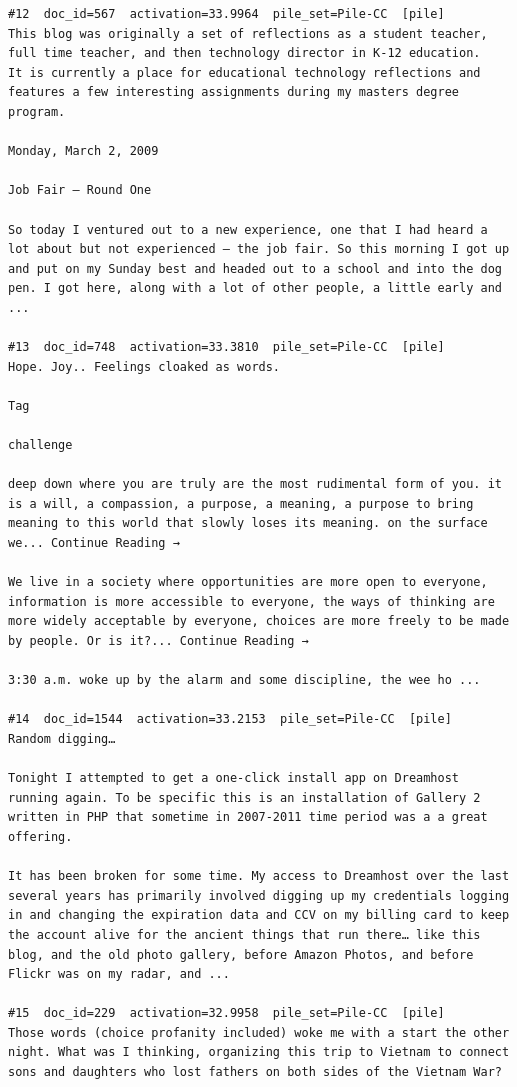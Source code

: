 \begin{verbatim}
#12  doc_id=567  activation=33.9964  pile_set=Pile-CC  [pile]
This blog was originally a set of reflections as a student teacher, full time teacher, and then technology director in K-12 education.
It is currently a place for educational technology reflections and features a few interesting assignments during my masters degree program.

Monday, March 2, 2009

Job Fair – Round One

So today I ventured out to a new experience, one that I had heard a lot about but not experienced – the job fair. So this morning I got up and put on my Sunday best and headed out to a school and into the dog pen. I got here, along with a lot of other people, a little early and ...

#13  doc_id=748  activation=33.3810  pile_set=Pile-CC  [pile]
Hope. Joy.. Feelings cloaked as words.

Tag

challenge

deep down where you are truly are the most rudimental form of you. it is a will, a compassion, a purpose, a meaning, a purpose to bring meaning to this world that slowly loses its meaning. on the surface we... Continue Reading →

We live in a society where opportunities are more open to everyone, information is more accessible to everyone, the ways of thinking are more widely acceptable by everyone, choices are more freely to be made by people. Or is it?... Continue Reading →

3:30 a.m. woke up by the alarm and some discipline, the wee ho ...

#14  doc_id=1544  activation=33.2153  pile_set=Pile-CC  [pile]
Random digging…

Tonight I attempted to get a one-click install app on Dreamhost running again. To be specific this is an installation of Gallery 2 written in PHP that sometime in 2007-2011 time period was a a great offering.

It has been broken for some time. My access to Dreamhost over the last several years has primarily involved digging up my credentials logging in and changing the expiration data and CCV on my billing card to keep the account alive for the ancient things that run there… like this blog, and the old photo gallery, before Amazon Photos, and before Flickr was on my radar, and ...

#15  doc_id=229  activation=32.9958  pile_set=Pile-CC  [pile]
Those words (choice profanity included) woke me with a start the other night. What was I thinking, organizing this trip to Vietnam to connect sons and daughters who lost fathers on both sides of the Vietnam War?


\end{verbatim}
